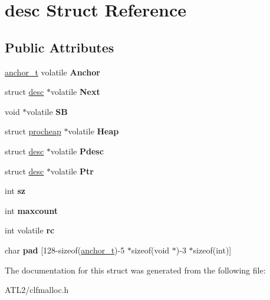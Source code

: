 \hypertarget{structdesc}{\section{desc Struct Reference}
\label{structdesc}
}
\subsection*{Public Attributes}
\begin{DoxyCompactItemize}
\item 
\hypertarget{structdesc_ad358c769c23436662792af01d3eab2bf}{\hyperlink{unionanchor}{anchor\+\_\+t} volatile {\bfseries Anchor}}\label{structdesc_ad358c769c23436662792af01d3eab2bf}

\item 
\hypertarget{structdesc_ae31d8899903a56aa97e718729875e50a}{struct \hyperlink{structdesc}{desc} $\ast$volatile {\bfseries Next}}\label{structdesc_ae31d8899903a56aa97e718729875e50a}

\item 
\hypertarget{structdesc_a8b0ac42993556992636d8bf66b54bd4f}{void $\ast$volatile {\bfseries S\+B}}\label{structdesc_a8b0ac42993556992636d8bf66b54bd4f}

\item 
\hypertarget{structdesc_a834d441ba28077480e8558d84bfb05ad}{struct \hyperlink{structprocheap}{procheap} $\ast$volatile {\bfseries Heap}}\label{structdesc_a834d441ba28077480e8558d84bfb05ad}

\item 
\hypertarget{structdesc_ab9c913fd3cea2e6db57562ff7a42b0ff}{struct \hyperlink{structdesc}{desc} $\ast$volatile {\bfseries Pdesc}}\label{structdesc_ab9c913fd3cea2e6db57562ff7a42b0ff}

\item 
\hypertarget{structdesc_a316928eba59ae110a5f9d0a2b36fc8e8}{struct \hyperlink{structdesc}{desc} $\ast$volatile {\bfseries Ptr}}\label{structdesc_a316928eba59ae110a5f9d0a2b36fc8e8}

\item 
\hypertarget{structdesc_a52206842e6c005dc691378005f8919a1}{int {\bfseries sz}}\label{structdesc_a52206842e6c005dc691378005f8919a1}

\item 
\hypertarget{structdesc_a1e70ec4da172fa2b96dd061b8a763cfc}{int {\bfseries maxcount}}\label{structdesc_a1e70ec4da172fa2b96dd061b8a763cfc}

\item 
\hypertarget{structdesc_a95a921f86a06e440ea819c7b2ab2b579}{int volatile {\bfseries rc}}\label{structdesc_a95a921f86a06e440ea819c7b2ab2b579}

\item 
\hypertarget{structdesc_a6674f8232b6e2b6f881b58c89d9071e7}{char {\bfseries pad} \mbox{[}128-\/sizeof(\hyperlink{unionanchor}{anchor\+\_\+t})-\/5 $\ast$sizeof(void $\ast$)-\/3 $\ast$sizeof(int)\mbox{]}}\label{structdesc_a6674f8232b6e2b6f881b58c89d9071e7}

\end{DoxyCompactItemize}


The documentation for this struct was generated from the following file\+:\begin{DoxyCompactItemize}
\item 
A\+T\+L2/clfmalloc.\+h\end{DoxyCompactItemize}
